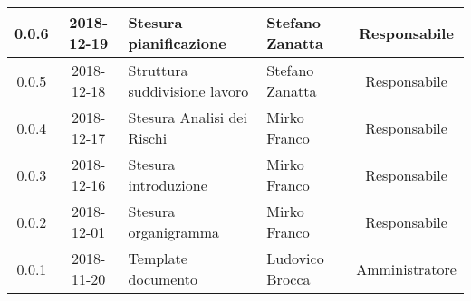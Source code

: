 \begin{center}
\begin{tabularx}{\textwidth}{|c|c|X|X|c|}
			\hline
			0.0.6 & 2018-12-19 & Stesura pianificazione & Stefano Zanatta & Responsabile\\
			\hline
			0.0.5 & 2018-12-18 & Struttura suddivisione lavoro & Stefano Zanatta & Responsabile\\
			\hline
			0.0.4 & 2018-12-17 & Stesura Analisi dei Rischi & Mirko Franco & Responsabile\\
			\hline
			0.0.3 & 2018-12-16 & Stesura introduzione &Mirko Franco& Responsabile\\
			\hline
			0.0.2 & 2018-12-01 & Stesura organigramma &Mirko Franco& Responsabile\\
			\hline
			0.0.1 & 2018-11-20 & Template documento& Ludovico Brocca & Amministratore\\			
			\hline
			
		\end{tabularx}
	\end{center}
\newpage